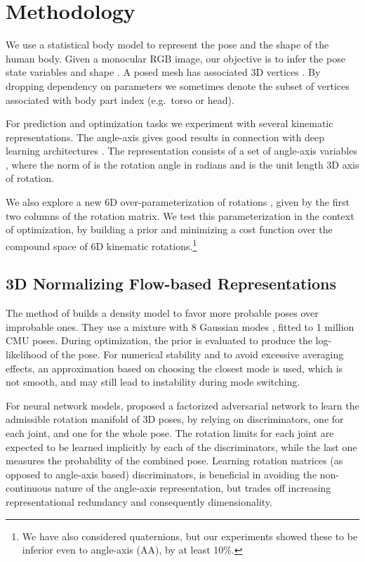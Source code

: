 \documentclass[runningheads]{llncs}
\newcommand{\eg}{e.g.\ }
\begin{document}
\section{Methodology}

We use a statistical body model \cite{SMPL2015,xu2020ghum} to represent the pose and the shape of the human body. Given a monocular RGB image, our objective is to infer the pose state variables  and shape . A posed mesh  has  associated 3D vertices . By dropping dependency on parameters we sometimes denote  the subset of vertices associated with body part index  (\eg torso or head). 


For prediction and optimization tasks we experiment with several kinematic representations. The angle-axis gives good results in connection with deep learning architectures \cite{Kanazawa2018,zanfir2018monocular}. The representation consists of a set of  angle-axis variables , where the norm of  is the rotation angle in radians and  is the unit length 3D axis of rotation. 

We also explore a new 6D over-parameterization of rotations \cite{zhou2018continuity}, given by the first two columns of the rotation matrix.
We test this parameterization in the context of optimization, by building a prior and minimizing a cost function over the compound space of 6D kinematic rotations.\footnote{We have also considered quaternions, but our experiments showed these to be inferior even to  angle-axis (AA), by at least 10\%.}

\subsection{3D Normalizing Flow-based Representations}

 The method of \cite{bogo2016} builds a density model to favor more probable poses over improbable ones. They use a mixture with 8 Gaussian modes , fitted to 1 million CMU poses. During optimization, the prior is evaluated to produce the log-likelihood of the pose. For numerical stability and to avoid excessive averaging effects, an approximation based on choosing the closest mode is used, which is not smooth, and may still lead to instability during mode switching. 

For neural network models, \cite{Kanazawa2018} proposed a factorized adversarial network to learn the admissible rotation manifold of 3D poses, by relying on  discriminators, one for each joint, and one for the whole pose. The rotation limits for each joint are expected to be learned implicitly by each of the  discriminators, while the last one measures the probability of the combined pose. Learning rotation matrices (as opposed to angle-axis based) discriminators, is beneficial in avoiding the non-continuous nature of the angle-axis representation, but trades off increasing representational redundancy and consequently dimensionality.
\end{document}
